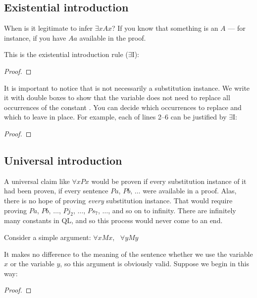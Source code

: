 \subsection{Existential introduction}

When is it legitimate to infer $\exists x Ax$? If you know that something is an $A$ --- for instance, if you have $Aa$ available in the proof.

This is the existential introduction rule ($\exists$I):

\begin{proof}
	 
\end{proof}

It is important to notice that \metaA{} is not necessarily a substitution instance. We write it with double boxes to show that the variable  does not need to replace all occurrences of the constant . You can decide which occurrences to replace and which to leave in place. For example, each of lines 2--6 can be justified by $\exists${}I:


\begin{proof}
	 
	 
	 
	 
	 
\end{proof}


\subsection{Universal introduction}
A universal claim like $\forall x Px$ would be proven if {every} substitution instance of it had been proven, if every sentence $Pa$, $Pb$, $\ldots$ were available in a proof. Alas, there is no hope of proving \emph{every} substitution instance. That would require proving $Pa$, $Pb$, $\ldots$, $Pj_2$, $\ldots$, $Ps_7$, $\ldots$, and so on to infinity. There are infinitely many constants in QL, and so this process would never come to an end.

Consider a simple argument: $\forall x Mx$, \therefore\ $\forall y My$

It makes no difference to the meaning of the sentence whether we use the variable $x$ or the variable $y$, so this argument is obviously valid. Suppose we begin in this way:

\begin{proof}
	 
	 
\end{proof}

